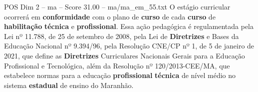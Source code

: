 \begin{textsample}{POS Dim 2 – ma – Score 31.00 – ma/ma\_em\_55.txt}
O estágio curricular ocorrerá em \textbf{conformidade} com o plano de \textbf{curso} de cada \textbf{curso} de \textbf{habilitação} \textbf{técnica} e \textbf{profissional}.
Essa ação pedagógica é regulamentada pela Lei nº 11.788, de 25 de setembro de 2008, pela Lei de \textbf{Diretrizes} e Bases da Educação Nacional nº 9.394/96, pela Resolução CNE/CP nº 1, de 5 de janeiro de 2021, que define as \textbf{Diretrizes} Curriculares Nacionais Gerais para a Educação Profissional e Tecnológica, além da Resolução nº 120/2013-CEE/MA, que estabelece normas para a educação \textbf{profissional} \textbf{técnica} de nível médio no sistema \textbf{estadual} de ensino do Maranhão.

\end{textsample}
